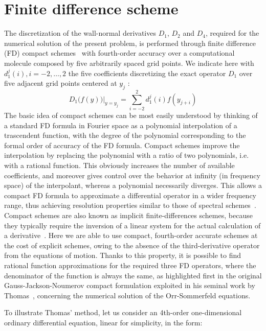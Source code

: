 \section{Finite difference scheme}
The discretization of the wall-normal derivatives $D_{1}$, $D_{2}$ and $D_{4}$, required for the numerical solution of the present problem, is performed through finite difference (FD) compact schemes~\cite{finite:difference:scheme} with fourth-order accuracy over a computational molecule composed by five arbitrarily spaced grid points. We indicate here with $d_{1}^{j} (i), i = -2, \dots , 2$ the five coefficients discretizing the exact operator $D_{1}$ over five adjacent grid points centered at $y_{j}$ :
\begin{equation}
D_{1} \big( f(y) \big) \vert_{y=y_{j}} = \sum_{i=-2}^{2} d_{1}^{j} (i) f(y_{j+i})
\end{equation}
The basic idea of compact schemes can be most easily understood by thinking of a standard FD formula in Fourier space as a polynomial interpolation of a trascendent function, with the degree of the polynomial corresponding to the formal order of accuracy of the FD formula. Compact schemes improve the interpolation by replacing the polynomial with a ratio of two polynomials, i.e. with a rational function. This obviously increases the number of available coefficients, and moreover gives control over the behavior at infinity (in frequency space) of the interpolant, whereas a polynomial necessarily diverges. This allows a compact FD formula to approximate a differential operator in a wider frequency range, thus achieving resolution properties similar to those of spectral schemes~\cite{finite:difference:scheme}.
Compact schemes are also known as implicit finite-differences schemes, because they typically require the inversion of a linear system for the actual calculation of a derivative~\cite{compact:difference}\cite{finite:difference:scheme}.
 Here we are able to use compact, fourth-order accurate schemes at the cost of explicit schemes, owing to the absence of the third-derivative operator from the equations of motion. Thanks to this property, it is possible to find rational function approximations for the required three FD operators, where the denominator of the function is always the same, as highlighted first in the original Gauss-Jackson-Noumerov compact formulation exploited in his seminal work by Thomas~\cite{Thomas:coeff}, concerning the numerical solution of the Orr-Sommerfeld equations.\par
To illustrate Thomas’ method, let us consider an 4th-order one-dimensional ordinary differential equation, linear for simplicity, in the form:
